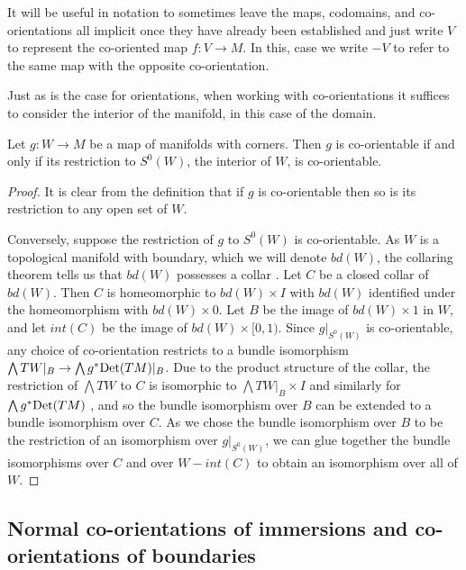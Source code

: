 \begin{notation}\label{N: implicit notation}
	It will be useful in notation to sometimes leave the maps, codomains, and co-orientations all implicit once they have already been established and just write $V$ to represent the co-oriented map $f \colon V \to M$.
	In this, case we write $-V$ to refer to the same map with the opposite co-orientation.
\end{notation}

Just as is the case for orientations, when working with co-orientations it suffices to consider the interior of the manifold, in this case of the domain.

\begin{proposition}\label{P: interior co-orientation}
Let $g \colon W \to M$ be a map of manifolds with corners. Then $g$ is co-orientable if and only if its restriction to $S^0(W)$, the interior of $W$, is co-orientable.
\end{proposition}
\begin{proof}
It is clear from the definition that if $g$ is co-orientable then so is its restriction to any open set of $W$.

Conversely, suppose the restriction of $g$ to $S^0(W)$ is co-orientable. As $W$ is a topological manifold with boundary, which we will denote $bd(W)$, the collaring theorem tells us that $bd(W)$ possesses a collar \cite[Theorem 2]{Bro62}. Let $C$ be a closed collar of $bd(W)$. Then $C$ is homeomorphic to $bd(W)\times I$ with $bd (W)$ identified under the homeomorphism with $bd(W) \times 0$. Let $B$ be the image of $bd(W) \times 1$ in $W$, and let $int(C)$ be the image of $bd(W) \times [0,1)$. Since $g|_{S^0(W)}$ is co-orientable, any choice of co-orientation restricts to a bundle isomorphism $\bigwedge TW|_B \to \bigwedge g^*{\rm Det}(TM)|_B$. Due to the product structure of the collar, the restriction of $\bigwedge TW$ to $C$ is isomorphic to $\bigwedge TW|_B \times I$ and similarly for $\bigwedge g^*{\rm Det}(TM)$ \cite[Theorem 3.4.4]{Hus94}, and so the bundle isomorphism over $B$ can be extended to a bundle isomorphism over $C$. As we chose the bundle isomorphism over $B$ to be the restriction of an isomorphism over $g|_{S^0(W)}$, we can glue together the bundle isomorphisms over $C$ and over $W-int(C)$ to obtain an isomorphism over all of $W$.
\end{proof}

\subsection{Normal co-orientations of immersions and co-orientations of boundaries}\label{S: normal orientation}

